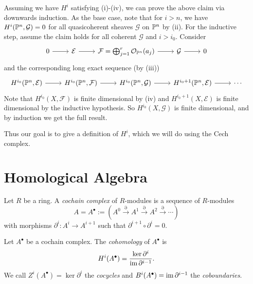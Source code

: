 \begin{remark}
\begin{enumerate}
      Assuming we have $H^i$ satisfying
      (i)-(iv), we can prove the above
      claim via downwards induction.
      As the base case, note that for
      $i > n$, we have
      $H^i(\mathbb{P}^n, \mathcal{G}) = 0$ for
      all quasicoherent sheaves $\mathcal{G}$ on $\mathbb{P}^n$ by (ii).
      For the inductive step, assume
      the claim holds for all coherent
      $\mathcal{G}$
      and $i > i_0$. Consider
      \[
        \begin{tikzcd}
          0 \ar[r] & \mathcal{E} \ar[r] & \mathcal{F} = \bigoplus_{j = 1}^r \OO_{\PP^n}(a_j)
          \ar[r] & \mathcal{G} \ar[r] & 0
        \end{tikzcd}
      \]
      and the corresponding long exact
      sequence (by (iii))
      \[
        \begin{tikzcd}
          H^{i_0}(\PP^n, \mathcal{E}) \ar[r] & H^{i_0}(\PP^n, \mathcal{F})
          \ar[r] & H^{i_0}(\PP^n, \mathcal{G})
          \ar[r] & H^{i_0 + 1}(\PP^n, \mathcal{E})
            \ar[r] & \cdots
        \end{tikzcd}
      \]
      Note that $H^{i_0}(X, \mathcal{F})$
      is finite dimensional by (iv)
      and $H^{i_0 + 1}(X, \mathcal{E})$ is finite dimensional
      by the inductive hypothesis.
      So
      $H^{i_0}(X, \mathcal{G})$ is finite dimensional, and by induction
      we get the full result.
  \end{enumerate}
  Thus our goal is to give a definition
  of $H^i$, which we will do
  using the Cech complex.
\end{remark}

\section{Homological Algebra}

\begin{definition}
  Let $R$ be a ring. A \emph{cochain complex}
  of $R$-modules is a sequence of
  $R$-modules
  \[
    A = A^\bullet
    := (A^0 \overset{\partial}{\longrightarrow} A^1 \overset{\partial}{\longrightarrow} A^2 \overset{\partial}{\longrightarrow} \cdots)
  \]
  with morphisms
  $\partial^i : A^i \to A^{i + 1}$ such
  that $\partial^{i + 1} \circ \partial^i = 0$.
\end{definition}

\begin{definition}
  Let $A^\bullet$ be a cochain complex.
  The \emph{cohomology} of $A^\bullet$ is
  \[
    H^i(A^\bullet)
    = \frac{\ker \partial^i}{\operatorname{im} \partial^{i - 1}}.
  \]
  We call $Z^i(A^\bullet) = \ker \partial^i$ the
  \emph{cocycles} and $B^i(A^\bullet) = \operatorname{im} \partial^{i - 1}$ the
  \emph{coboundaries}.
\end{definition}

